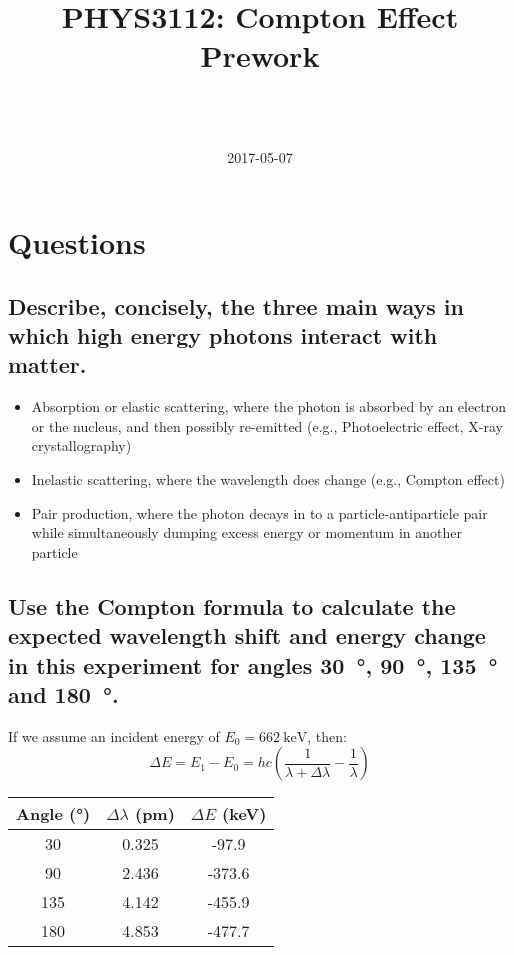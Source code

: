 \documentclass[a4paper]{scrartcl}
\begin{document}
\title{PHYS3112: Compton Effect Prework}
\author{ \\ \\ }
\date{2017-05-07}
\maketitle

\section{Questions}
\subsection{Describe, concisely, the three main ways in which high energy photons interact with matter.}
\begin{itemize}
    \item Absorption or elastic scattering, where the photon is absorbed by an electron or the nucleus, and then possibly re-emitted (e.g., Photoelectric effect, X-ray crystallography)
    \item Inelastic scattering, where the wavelength does change (e.g., Compton effect)
    \item Pair production, where the photon decays in to a particle-antiparticle pair while simultaneously dumping excess energy or momentum in another particle
\end{itemize}

\subsection{Use the Compton formula to calculate the expected wavelength shift and energy change in this experiment for angles \SI{30}{\degree}, \SI{90}{\degree}, \SI{135}{\degree} and \SI{180}{\degree}.}
If we assume an incident energy of \(E_0 = \SI{662}{\kilo\electronvolt}\), then:
\[\Delta E = E_1 - E_0 = h c \left(\frac{1}{\lambda + \Delta \lambda} - \frac{1}{\lambda}\right)\]
\begin{center}
\begin{tabular}{c | c | c}
    Angle (\si{\degree}) & \(\Delta \lambda\) (\si{\pico\metre}) & \(\Delta E\) (\si{\kilo\electronvolt}) \\
    \hline
    30 & 0.325 & -97.9 \\
    90 & 2.436 & -373.6 \\
    135 & 4.142 & -455.9 \\
    180 & 4.853 & -477.7
\end{tabular}
\end{center}
\end{document}

